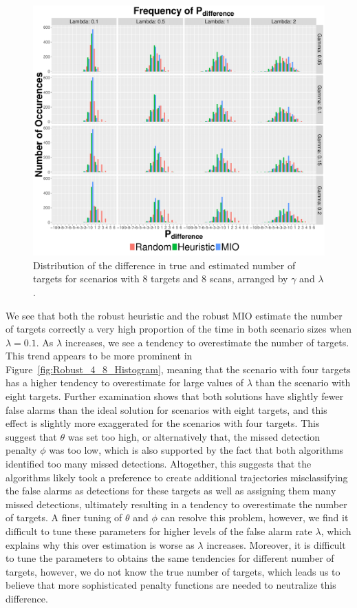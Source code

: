 \begin{figure}[ht]
  \centering
  \includegraphics[width=\columnwidth]{../Figures/8_8_Histogram}
  \caption{Distribution of the difference in true and estimated number of targets for scenarios with 8 targets and 8 scans, arranged by $\gamma$ and $\lambda$.}
  \label{fig:Robust_8_8_Histogram}
\end{figure}

We see that both the robust heuristic and the robust MIO estimate the number of targets correctly a very high proportion of the time in both scenario sizes when $\lambda = 0.1$. As $\lambda$ increases, we see a tendency to overestimate the number of targets. This trend appears to be more prominent in Figure~\ref{fig:Robust_4_8_Histogram}, meaning that the scenario with four targets has a higher tendency to overestimate for large values of $\lambda$ than the scenario with eight targets. Further examination shows that both solutions have slightly fewer false alarms than the ideal solution for scenarios with eight targets, and this effect is slightly more exaggerated for the scenarios with four targets. This suggest that $\theta$ was set too high, or alternatively that, the missed detection penalty $\phi$ was too low, which is also supported by the fact that both algorithms identified too many missed detections. Altogether, this suggests that the algorithms likely took a preference to create additional trajectories misclassifying the false alarms as detections for these targets as well as assigning them many missed detections, ultimately resulting in a tendency to overestimate the number of targets. A finer tuning of $\theta$ and $\phi$ can resolve this problem, however, we find it difficult to tune these parameters for higher levels of the false alarm rate $\lambda$, which explains why this over estimation is worse as $\lambda$ increases. Moreover, it is difficult to tune the parameters to obtains the same tendencies for different number of targets, however, we do not know the true  number of targets, which leads us to believe that more sophisticated penalty functions are needed to neutralize this difference.

